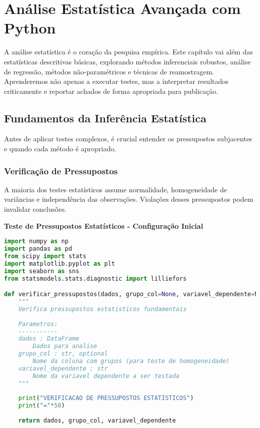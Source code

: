 
\chapter{Análise Estatística Avançada com Python}

A análise estatística é o coração da pesquisa empírica. Este capítulo vai além das estatísticas descritivas básicas, explorando métodos inferenciais robustos, análise de regressão, métodos não-paramétricos e técnicas de reamostragem. Aprenderemos não apenas a executar testes, mas a interpretar resultados criticamente e reportar achados de forma apropriada para publicação.

\section{Fundamentos da Inferência Estatística}

Antes de aplicar testes complexos, é crucial entender os pressupostos subjacentes e quando cada método é apropriado.

\subsection{Verificação de Pressupostos}

A maioria dos testes estatísticos assume normalidade, homogeneidade de variâncias e independência das observações. Violações desses pressupostos podem invalidar conclusões.

\begin{examplebox}
\textbf{Teste de Pressupostos Estatísticos - Configuração Inicial}

\begin{lstlisting}[language=Python]
import numpy as np
import pandas as pd
from scipy import stats
import matplotlib.pyplot as plt
import seaborn as sns
from statsmodels.stats.diagnostic import lilliefors

def verificar_pressupostos(dados, grupo_col=None, variavel_dependente=None):
    """
    Verifica pressupostos estatisticos fundamentais
    
    Parametros:
    -----------
    dados : DataFrame
        Dados para analise
    grupo_col : str, optional
        Nome da coluna com grupos (para teste de homogeneidade)
    variavel_dependente : str
        Nome da variavel dependente a ser testada
    """
    
    print("VERIFICACAO DE PRESSUPOSTOS ESTATISTICOS")
    print("="*50)
    
    return dados, grupo_col, variavel_dependente
\end{lstlisting}
\end{examplebox}

